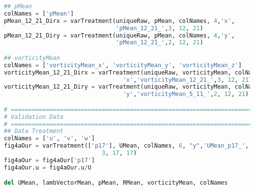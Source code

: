 \begin{lstlisting}[language=python]
## pMean
colNames = ['pMean']
pMean_12_21_Dirx = varTreatment(uniqueRaw, pMean, colNames, 4,'x',
                                'pMean_12_21_',3, 12, 21)
pMean_12_21_Diry = varTreatment(uniqueRaw, pMean, colNames, 4,'y',
                                'pMean_12_21_',2, 12, 21)

## vorticityMean
colNames = ['vorticityMean_x', 'vorticityMean_y', 'vorticityMean_z']
vorticityMean_12_21_Dirx = varTreatment(uniqueRaw, vorticityMean, colNames, 6,
                                  'x','vorticityMean_12_21_',3, 12, 21)
vorticityMean_12_21_Diry = varTreatment(uniqueRaw, vorticityMean, colNames, 6,
                                  'y','vorticityMean_5_11_',2, 12, 21)

# =============================================================================
# Validation Data
# =============================================================================
## Data Treatment
colNames = ['u', 'v', 'w']
fig4aOur = varTreatment(['p17'], UMean, colNames, 6, "y",'UMean_p17_',
                            3, 17, 17)
fig4aOur = fig4aOur['p17']
fig4aOur.u = fig4aOur.u/U

del UMean, lambVectorMean, pMean, RMean, vorticityMean, colNames

\end{lstlisting}

